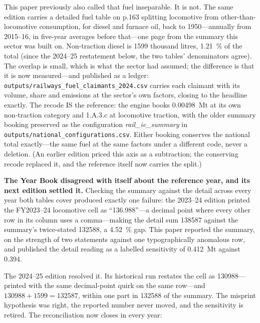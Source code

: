This paper previously also called that fuel inseparable. It is not. The same edition carries a
detailed fuel table on p.163 splitting locomotive from other-than-locomotive consumption, for
diesel and furnace oil, back to 1950---annually from 2015--16, in five-year averages before
that---one page from the summary this sector was built on. Non-traction diesel is
\SI{1599}{} thousand litres, \SI{1.21}{\percent} of the total (since the 2024--25
restatement below, the two tables' denominators agree). The
overlap is small, which is what the sector had assumed; the difference is that it is now
measured---and published as a ledger:
\texttt{outputs/railways\_fuel\_claimants\_2024.csv} carries each claimant with its
volume, share and emissions at the sector's own factors, closing to the headline exactly.
The recode IS the reference: the engine books
\SI{0.00498}{\mega\tonne} at its own non-traction category and 1.A.3.c at locomotive
traction, with the older summary booking preserved as the configuration
\emph{rail\_ie\_summary} in
\texttt{outputs/national\_configurations.csv}. Either booking conserves the national
total exactly---the same fuel at the same
factors under a different code, never a deletion. (An earlier edition priced this axis
as a subtraction; the conserving recode replaced it, and the reference itself now
carries the split.)

\textbf{The Year Book disagreed with itself about the reference year, and its next edition
settled it.} Checking the summary against the detail across every year both tables cover
produced exactly one failure: the 2023--24 edition printed the FY2023--24 locomotive cell as
``136.988''---a decimal point where every other row in its column uses a comma---making the
detail sum \num{138587} against the summary's twice-stated \num{132588}, a
\SI{4.52}{\percent} gap. This paper reported the summary, on the strength of two statements
against one typographically anomalous row, and published the detail reading as a labelled
sensitivity of \SI{0.412}{\mega\tonne} against \SI{0.394}{}.

The 2024--25 edition resolved it. Its historical run restates the cell as
\num{130988}---printed with the same decimal-point quirk on the same row---and
$\num{130988}+\num{1599}=\num{132587}$, within one part in \num{132588} of the summary. The
misprint hypothesis was right, the reported number never moved, and the sensitivity is
retired. The reconciliation now closes in every year:

